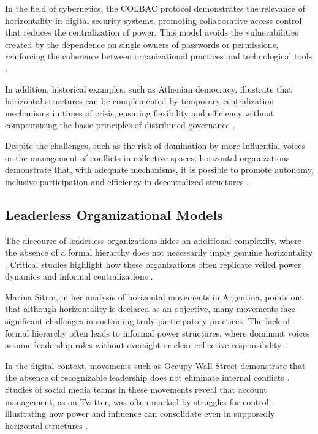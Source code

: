 In the field of cybernetics, the COLBAC protocol demonstrates the relevance of
horizontality in digital security systems, promoting collaborative access
control that reduces the centralization of power. This model avoids the
vulnerabilities created by the dependence on single owners of passwords or
permissions, reinforcing the coherence between organizational practices and
technological tools \cite{Colbac}.

In addition, historical examples, such as Athenian democracy, illustrate that
horizontal structures can be complemented by temporary centralization mechanisms
in times of crisis, ensuring flexibility and efficiency without compromising the
basic principles of distributed governance \cite{AthenianDemocracyABrief}.

Despite the challenges, such as the risk of domination by more influential
voices or the management of conflicts in collective spaces, horizontal
organizations demonstrate that, with adequate mechanisms, it is possible to
promote autonomy, inclusive participation and efficiency in decentralized
structures \cite{SocialMediaTeamsAsDigitalVanguards}.

\subsection{Leaderless Organizational Models}
\label{subsec:leaderless_organizational_models}

The discourse of leaderless organizations hides an additional complexity, where
the absence of a formal hierarchy does not necessarily imply genuine
horizontality \cite{SocialMediaTeamsAsDigitalVanguards}. Critical studies
highlight how these organizations often replicate veiled power dynamics and
informal centralizations \cite{SocialMediaTeamsAsDigitalVanguards,
EverydayRevolutions}.

Marina Sitrin, in her analysis of horizontal movements in Argentina, points out
that although horizontality is declared as an objective, many movements face
significant challenges in sustaining truly participatory practices. The lack of
formal hierarchy often leads to informal power structures, where dominant voices
assume leadership roles without oversight or clear collective responsibility
\cite{EverydayRevolutions}.

In the digital context, movements such as Occupy Wall Street demonstrate that
the absence of recognizable leadership does not eliminate internal conflicts
\cite{SocialMediaTeamsAsDigitalVanguards}. Studies of social media teams in
these movements reveal that account management, as on Twitter, was often marked
by struggles for control, illustrating how power and influence can consolidate
even in supposedly horizontal structures
\cite{SocialMediaTeamsAsDigitalVanguards}.

